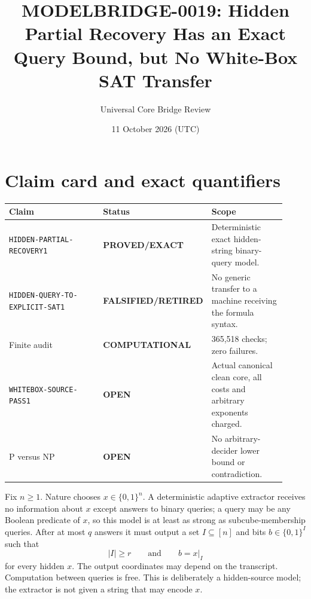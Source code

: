 \documentclass[11pt]{article}
\title{MODELBRIDGE-0019: Hidden Partial Recovery Has an Exact Query Bound, but No White-Box SAT Transfer}
\author{Universal Core Bridge Review}
\date{11 October 2026 (UTC)}
\newcommand{\EXACT}{\textbf{PROVED/EXACT}}
\newcommand{\COMP}{\textbf{COMPUTATIONAL}}
\newcommand{\OPEN}{\textbf{OPEN}}
\newcommand{\RETIRED}{\textbf{FALSIFIED/RETIRED}}
\begin{document}
\maketitle

\begin{center}
\end{center}

\section{Claim card and exact quantifiers}

\begin{center}\small
\begin{tabular}{@{}p{0.43\linewidth}p{0.19\linewidth}p{0.30\linewidth}@{}}
\toprule
Claim & Status & Scope\\ \midrule
\texttt{HIDDEN-PARTIAL-RECOVERY1} & \EXACT & Deterministic exact hidden-string binary-query model.\\
\texttt{HIDDEN-QUERY-TO-EXPLICIT-SAT1} & \RETIRED & No generic transfer to a machine receiving the formula syntax.\\
Finite audit & \COMP & 365,518 checks; zero failures.\\
\texttt{WHITEBOX-SOURCE-PASS1} & \OPEN & Actual canonical clean core, all costs and arbitrary exponents charged.\\
P versus NP & \OPEN & No arbitrary-decider lower bound or contradiction.\\
\bottomrule
\end{tabular}
\end{center}

Fix $n\ge 1$.  Nature chooses $x\in\{0,1\}^n$.  A deterministic adaptive extractor receives no information about $x$ except answers to binary queries; a query may be any Boolean predicate of $x$, so this model is at least as strong as subcube-membership queries.  After at most $q$ answers it must output a set $I\subseteq[n]$ and bits $b\in\{0,1\}^I$ such that
\[
 |I|\ge r\qquad\text{and}\qquad b=x|_I
 \tag{1}
\]
for every hidden $x$.  The output coordinates may depend on the transcript.  Computation between queries is free.  This is deliberately a hidden-source model; the extractor is not given a string that may encode $x$.
\end{document}
